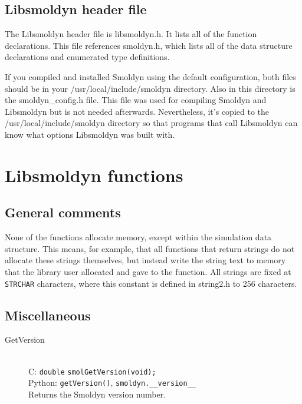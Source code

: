 \documentclass {book}
\begin{document}
\section{Libsmoldyn header file}

The Libsmoldyn header file is libsmoldyn.h. It lists all of the function declarations. This file references smoldyn.h, which lists all of the data structure declarations and enumerated type definitions.

If you compiled and installed Smoldyn using the default configuration, both files should be in your /usr/local/include/smoldyn directory. Also in this directory is the smoldyn\_config.h file. This file was used for compiling Smoldyn and Libsmoldyn but is not needed afterwards. Nevertheless, it's copied to the /usr/local/include/smoldyn directory so that programs that call Libsmoldyn can know what options Libsmoldyn was built with.


\chapter{Libsmoldyn functions}

\section{General comments}

None of the functions allocate memory, except within the simulation data structure. This means, for example, that all functions that return strings do not allocate these strings themselves, but instead write the string text to memory that the library user allocated and gave to the function.
All strings are fixed at \texttt{STRCHAR} characters, where this constant is defined in string2.h to 256 characters.

\section{Miscellaneous}

\begin{description}

\item[GetVersion]
\hfill \\
C: \texttt{double} \texttt{smolGetVersion(void);}\\
Python: \texttt{getVersion()}, \texttt{smoldyn.\_\_version\_\_} \\
Returns the Smoldyn version number.

\end{description}
\end{document}
